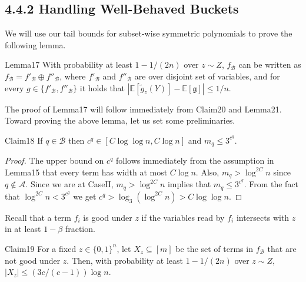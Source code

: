 \subsection*{4.4.2 Handling Well-Behaved Buckets}
We will use our tail bounds for subset-wise symmetric polynomials to prove the following lemma.
\begin{authorclaim}{Lemma17}
With probability at least $1-1/(2n)$ over $z\sim Z$, $f_{\mathcal B}$ can be written as $f_{\mathcal B}=f'_{\mathcal B}\oplus f''_{\mathcal B}$, where $f'_{\mathcal B}$ and $f''_{\mathcal B}$ are over disjoint set of variables, and for every $g\in\{f'_{\mathcal B},f''_{\mathcal B}\}$ it holds that $|\mathbb E[\widetilde g_z(Y)]-\mathbb E[\mathfrak g]|\le1/n$.
\end{authorclaim}
The proof of Lemma17 will follow immediately from Claim20 and Lemma21. Toward proving the above lemma, let us set some preliminaries.
\begin{authorclaim}{Claim18}
If $q\in\mathcal B$ then $c^q\in[C\log\log n,C\log n]$ and $m_q\le3^{c^q}$.
\end{authorclaim}
\begin{proof}
The upper bound on $c^q$ follows immediately from the assumption in Lemma15 that every term has width at most $C\log n$. Also, $m_q>\log^{2C}n$ since $q\notin\mathcal A$. Since we are at CaseII, $m_q>\log^{2C}n$ implies that $m_q\le3^{c^q}$. From the fact that $\log^{2C}n<3^{c^q}$ we get $c^q>\log_3(\log^{2C}n)>C\log\log n$.
\end{proof}
Recall that a term $f_i$ is good under $z$ if the variables read by $f_i$ intersects with $z$ in at least $1-\beta$ fraction.
\begin{authorclaim}{Claim19}
For a fixed $z\in\{0,1\}^n$, let $X_z\subseteq[m]$ be the set of terms in $f_{\mathcal B}$ that are not good under $z$. Then, with probability at least $1-1/(2n)$ over $z\sim Z$, $|X_z|\le(3c/(c-1))\log n$.
\end{authorclaim}
